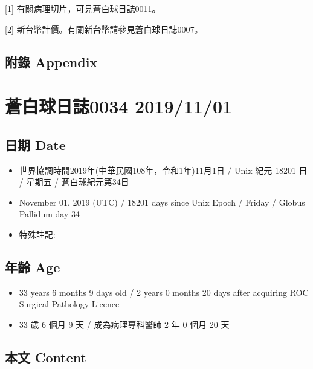 \documentclass[a5paper, 12pt
]{book}
\providecommand{\tightlist}{%
  \setlength{\itemsep}{0pt}\setlength{\parskip}{0pt}}
\begin{document}
{[}1{]} 有關病理切片，可見蒼白球日誌0011。

{[}2{]} 新台幣計價。有關新台幣請參見蒼白球日誌0007。

\hypertarget{ux9644ux9304-appendix-25}{%
\subsection{附錄 Appendix}\label{ux9644ux9304-appendix-25}}

\hypertarget{ux84bcux767dux7403ux65e5ux8a8c0034-20191101}{%
\section{蒼白球日誌0034
2019/11/01}\label{ux84bcux767dux7403ux65e5ux8a8c0034-20191101}}

\hypertarget{ux65e5ux671f-date-33}{%
\subsection{日期 Date}\label{ux65e5ux671f-date-33}}

\begin{itemize}
\tightlist
\item
  世界協調時間2019年(中華民國108年，令和1年)11月1日 / Unix 紀元 18201 日
  / 星期五 / 蒼白球紀元第34日
\item
  November 01, 2019 (UTC) / 18201 days since Unix Epoch / Friday /
  Globus Pallidum day 34
\item
  特殊註記:
\end{itemize}

\hypertarget{ux5e74ux9f61-age-33}{%
\subsection{年齡 Age}\label{ux5e74ux9f61-age-33}}

\begin{itemize}
\tightlist
\item
  33 years 6 months 9 days old / 2 years 0 months 20 days after
  acquiring ROC Surgical Pathology Licence
\item
  33 歲 6 個月 9 天 / 成為病理專科醫師 2 年 0 個月 20 天
\end{itemize}

\hypertarget{ux672cux6587-content-33}{%
\subsection{本文 Content}\label{ux672cux6587-content-33}}
\end{document}
